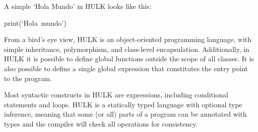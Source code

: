 A simple `Hola Mundo' in HULK looks like this:

    \hbox{print{(`Hola mundo')}}

    From a bird's eye view, HULK is an object-oriented programming language, with simple inheritance, polymorphism, and class-level encapsulation. Additionally, in HULK it is possible to define global functions outside the scope of all classes. It is also possible to define a single global expression that constitutes the entry point to the program.

    Most syntactic constructs in HULK are expressions, including conditional statements and loops. HULK is a statically typed language with optional type inference, meaning that some (or all) parts of a program can be annotated with types and the compiler will check all operations for consistency.


